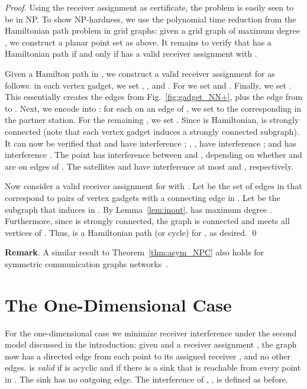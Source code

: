 \documentclass[envcountsect,envcountsame,runningheads,a4paper]{llncs}
\begin{document}
\begin{proof}
Using the receiver assignment  as certificate,
the problem is easily seen to be in NP.
To show NP-hardness, we use the polynomial time reduction
from the Hamiltonian path problem in grid graphs:
given a grid graph  of maximum degree
, we construct a planar point set  as above.
It remains to verify that  has a Hamiltonian path
if and only if  has a valid receiver assignment 
with .

Given a Hamilton path  in
, we construct
a valid receiver assignment  for
 as follows:
in each vertex gadget, we set ,
, and . For
 we set  and
.
Finally, we set .
This essentially creates the edges from
Fig.~\ref{fig:gadget_NN+}, plus the edge
from  to .
Next, we encode  into : for each  on
an edge of , we set   to the corresponding
 in the partner station. For the remaining
, we set .
Since  is Hamiltonian,
 is
strongly connected (note that
each vertex gadget induces a strongly connected
subgraph).
It can now be verified that  and  have
interference ;
, ,  have interference ; and
 has interference .
The point  has interference between  and
, depending on whether  and  are
on edges of .
The satellites  and 
have interference at most  and ,
respectively.

Now consider a valid receiver assignment  for
 with
.
Let  be the set of edges in  that correspond
to  pairs of vertex gadgets with a connecting edge
in .
Let  be the subgraph that  induces in .
By Lemma~\ref{lem:inout},  has maximum degree .
Furthermore, since  is strongly connected,
the graph  is connected and meets all vertices of .
Thus,  is a Hamiltonian path (or cycle) for ,
as desired.
\qed{}
\end{proof}

\textbf{Remark}.  A similar result to Theorem~\ref{thm:asym_NPC}
also holds for symmetric communication graphs networks~\cite{Buchin08}.

\section{The One-Dimensional Case}

For the one-dimensional case we
minimize receiver interference under the second model discussed in the introduction:
given  and
a receiver assignment
, the graph
 now has a directed edge from each point 
to its assigned receiver , and no other edges.
 is \emph{valid} if  is acyclic and if
there is a sink  that is reachable from every
point in . The sink has no outgoing edge. The interference
of , ,  is defined as before.
\end{document}

